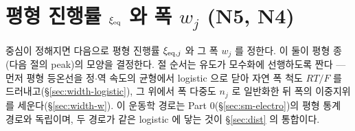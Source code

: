 \section{평형 진행률 $\xi_{\mathrm{eq}}$ 와 폭 $w_j$ (N5, N4)}\label{sec:width}
중심이 정해지면 다음으로 평형 진행률 $\xi_{\mathrm{eq},j}$ 와 그 폭 $w_j$ 를 정한다. 이 둘이 평형 종(다음 절의 peak)의
모양을 결정한다. 절 순서는 유도가 모수화에 선행하도록 짠다 --- 먼저 평형 등온선을 정$\cdot$역 속도의 균형에서
logistic 으로 닫아 자연 폭 척도 $RT/F$ 를 드러내고(\S\ref{sec:width-logistic}), 그 위에서 폭 다중도 $n_j$ 로
일반화한 뒤 폭의 이중지위를 세운다(\S\ref{sec:width-w}). 이 운동학 경로는 Part 0(\S\ref{sec:sm-electro})의 평형
통계 경로와 독립이며, 두 경로가 같은 logistic 에 닿는 것이 \S\ref{sec:dist} 의 통합이다.

